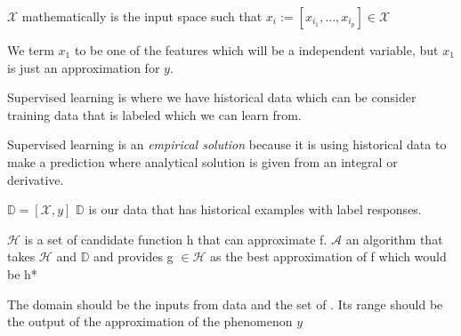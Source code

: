 \documentclass[12pt]{article}
\begin{document}
\begin{enumerate}

$\mathcal{X}$ mathematically is the input space such that $x_i := [x_i_1, \ldots, x_i_p] \in \mathcal{X}$


We term $x_1$ to be one of the features which will be a independent variable, but $x_1$ is just an approximation for $y$.


Supervised learning is where we have historical data which can be consider training data that is labeled which we can learn from. 


Supervised learning is an \emph{empirical solution} because it is using historical data to make a prediction where analytical solution is given from an integral or derivative. 


$\mathbb{D} = [\mathcal{X}, y]$ $\mathbb{D}$ is our data that has historical examples with label responses. 


$\mathcal{H}$ is a set of candidate function h that can approximate f.
$\mathcal{A}$ an algorithm that takes $\mathcal{H}$ and $\mathbb{D}$ and provides g $\in \mathcal{H}$
as the best approximation of f which would be h*


The domain should be the inputs from data  and the set of . Its range should be the output of the approximation of the phenomenon $y$



\end{enumerate}
\end{document}
